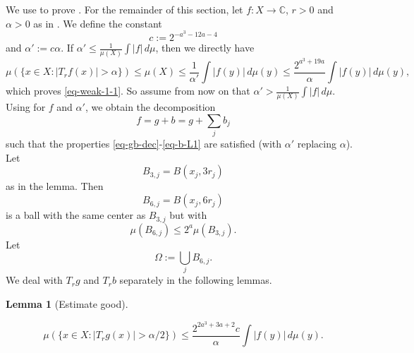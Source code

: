 \documentclass[10pt,a4paper]{article}
\theoremstyle{plain}
\newtheorem{lemma}[theorem]{Lemma}
\theoremstyle{definition}
\numberwithin{equation}{subsection}
\newcommand{\lean}[1]{}
\newcommand{\uses}[1]{}
\newcommand{\leanok}{}
\def\C{\mathbb{C}}
\begin{document}
We use  to prove . For the remainder of this section, let $f:X\to\C$, $r>0$ and $\alpha>0$ as in .
We define the constant
\begin{equation} \label{weak-1-1-proof-cz-const}
    c:= 2^{-a^3-12a-4}
\end{equation}
and $\alpha' := c\alpha$. If $\alpha'\le\frac{1}{\mu(X)}\int |f|\,d\mu$, then we directly have
\begin{equation*}
    \mu\left(\{x\in X: |T_r f(x)|>\alpha\}\right)\le \mu(X) \le \frac{1}{\alpha'} \int |f(y)|\, d\mu(y)
    \le \frac{2^{a^3 + 19a}}{\alpha} \int |f(y)|\, d\mu(y),
\end{equation*}
which proves \eqref{eq-weak-1-1}.
So assume from now on that $\alpha'>\frac{1}{\mu(X)}\int |f|\,d\mu$.
Using  for $f$ and $\alpha'$, we obtain the decomposition
\begin{equation*}
    f=g+b=g+\sum_j b_j
\end{equation*}
such that the properties \eqref{eq-gb-dec}-\eqref{eq-b-L1} are satisfied (with $\alpha'$ replacing $\alpha$). Let
\begin{equation}
    \label{eq-Ij-cj}
    B_{3,j}=B(x_j, 3r_j)
\end{equation}
as in the lemma. Then
\begin{equation}
    \label{eq-Ij*}
    B_{6,j}=B(x_j, 6r_j)
\end{equation}
is a ball with the same center as $B_{3,j}$ but with
\begin{equation}
    \label{eq-Ij*-dim}
    \mu(B_{6,j})\le 2^{a} \mu(B_{3,j}).
\end{equation}
Let
\begin{equation}
    \label{eq-omega}
    \Omega:=\bigcup_j B_{6,j}.
\end{equation}
We deal with $T_rg$ and $T_rb$ separately in the following lemmas.

\begin{lemma}[Estimate good]
    \label{estimate-good}
    \leanok
    \lean{estimate_good}
    \uses{Calderon-Zygmund-decomposition}
    \begin{equation*}
        \mu\left(\{x\in X: |T_r g(x)|>{\alpha}/2\}\right)
        \le \frac{2^{2a^3+3a+2}c}{\alpha} \int |f(y)|\, d\mu(y).
    \end{equation*}

\end{lemma}
\end{document}
